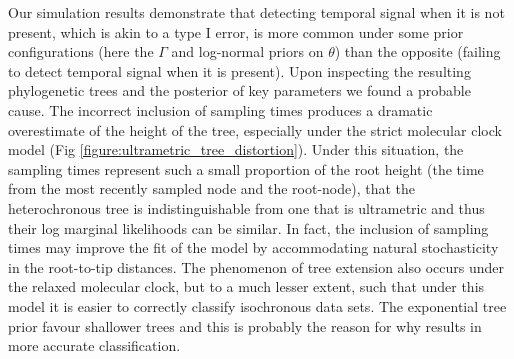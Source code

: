 \documentclass[10pt,letterpaper]{article}
\begin{document}
Our simulation results demonstrate that detecting temporal signal when it is not present, which is akin to a type I error, is more common under some prior configurations (here the $\Gamma$ and log-normal priors on $\theta$) than the opposite (failing to detect temporal signal when it is present). Upon inspecting the resulting phylogenetic trees and the posterior of key parameters we found a probable cause. The incorrect inclusion of sampling times produces a dramatic overestimate of the height of the tree, especially under the strict molecular clock model (Fig \ref{figure:ultrametric_tree_distortion}). Under this situation, the sampling times represent such a small proportion of the root height (the time from the most recently sampled node and the root-node), that the heterochronous tree is indistinguishable from one that is ultrametric and thus their log marginal likelihoods can be similar. In fact, the inclusion of sampling times may improve the fit of the model by accommodating natural stochasticity in the root-to-tip distances. The phenomenon of tree extension also occurs under the relaxed molecular clock, but to a much lesser extent, such that under this model it is easier to correctly classify isochronous data sets. The exponential tree prior favour shallower trees and this is probably the reason for why results in more accurate classification.
\end{document}
